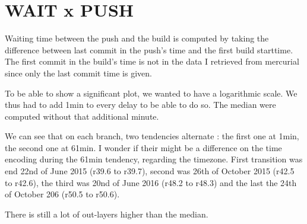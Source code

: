 \section{WAIT x PUSH}

Waiting time between the push and the build is computed by taking the difference between last commit in the push's time and the first build starttime. The first commit in the build's time is not in the data I retrieved from mercurial since only the last commit time is given. 

To be able to show a significant plot, we wanted to have a logarithmic scale. We thus had to add 1min to every delay to be able to do so. The median were computed without that additional minute.

We can see that on each branch, two tendencies alternate : the first one at 1min, the second one at 61min. I wonder if their might be a difference on the time encoding during the 61min tendency, regarding the timezone. First transition was end 22nd of June 2015 (r39.6 to r39.7), second was 26th of October 2015 (r42.5 to r42.6), the third was 20nd of June 2016 (r48.2 to r48.3) and the last the 24th of October 206 (r50.5 to r50.6).


There is still a lot of out-layers higher than the median.





